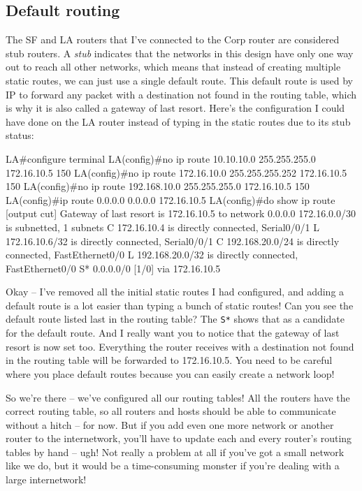 \subsection{Default routing}

The SF and LA routers that I've connected to the Corp router are
considered stub routers. A \emph{stub} indicates that the networks in
this design have only one way out to reach all other networks, which
means that instead of creating multiple static routes, we can just use a
single default route. This default route is used by IP to forward any
packet with a destination not found in the routing table, which is why
it is also called a gateway of last resort. Here's the configuration I
could have done on the LA router instead of typing in the static routes
due to its stub status:

\begin{cli}
LA#configure terminal
LA(config)#no ip route 10.10.10.0 255.255.255.0 172.16.10.5 150
LA(config)#no ip route 172.16.10.0 255.255.255.252 172.16.10.5 150
LA(config)#no ip route 192.168.10.0 255.255.255.0 172.16.10.5 150
LA(config)#ip route 0.0.0.0 0.0.0.0 172.16.10.5
LA(config)#do show ip route
[output cut]
Gateway of last resort is 172.16.10.5 to network 0.0.0.0
172.16.0.0/30 is subnetted, 1 subnets
C       172.16.10.4 is directly connected, Serial0/0/1
L       172.16.10.6/32 is directly connected, Serial0/0/1
C    192.168.20.0/24 is directly connected, FastEthernet0/0
L    192.168.20.0/32 is directly connected, FastEthernet0/0
S*   0.0.0.0/0 [1/0] via 172.16.10.5
\end{cli}

Okay -- I've removed all the initial static routes I had configured, and
adding a default route is a lot easier than typing a bunch of static
routes! Can you see the default route listed last in the routing table?
The \texttt{S*} shows that as a candidate for the default route. And I
really want you to notice that the gateway of last resort is now set
too. Everything the router receives with a destination not found in the
routing table will be forwarded to 172.16.10.5. You need to be careful
where you place default routes because you can easily create a network
loop!

So we're there -- we've configured all our routing tables! All the
routers have the correct routing table, so all routers and hosts should
be able to communicate without a hitch -- for now. But if you add even
one more network or another router to the internetwork, you'll have to
update each and every router's routing tables by hand -- ugh! Not really
a problem at all if you've got a small network like we do, but it would
be a time-consuming monster if you're dealing with a large internetwork!

